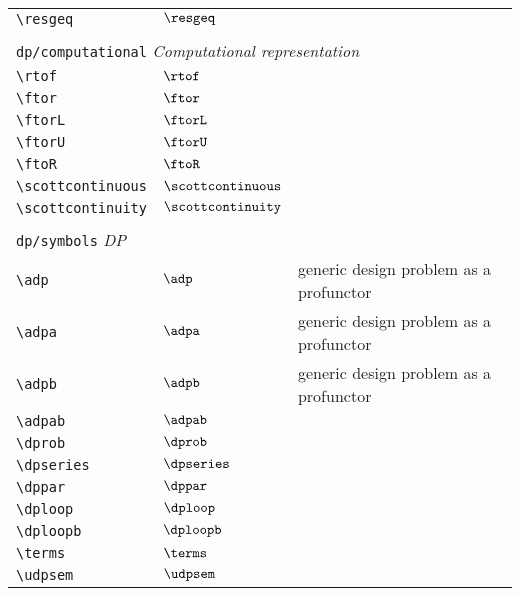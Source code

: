 \begin{longtable}{lll}
 {\color[rgb]{0.5,0.5,0.5}\texttt{\textbackslash resgeq}} & $\resgeq$ & \\ 
  &  & \\ 
 \multicolumn{3}{l}{{\color[rgb]{0.5,0.5,0.5}\texttt{dp/computational}} \emph{Computational representation}}\\ 
 \hline
{\color[rgb]{0.5,0.5,0.5}\texttt{\textbackslash rtof}} & $\rtof$ & \\ 
 {\color[rgb]{0.5,0.5,0.5}\texttt{\textbackslash ftor}} & $\ftor$ & \\ 
 {\color[rgb]{0.5,0.5,0.5}\texttt{\textbackslash ftorL}} & $\ftorL$ & \\ 
 {\color[rgb]{0.5,0.5,0.5}\texttt{\textbackslash ftorU}} & $\ftorU$ & \\ 
 {\color[rgb]{0.5,0.5,0.5}\texttt{\textbackslash ftoR}} & $\ftoR$ & \\ 
 {\color[rgb]{0.5,0.5,0.5}\texttt{\textbackslash scottcontinuous}} & $\scottcontinuous$ & \\ 
 {\color[rgb]{0.5,0.5,0.5}\texttt{\textbackslash scottcontinuity}} & $\scottcontinuity$ & \\ 
  &  & \\ 
 \multicolumn{3}{l}{{\color[rgb]{0.5,0.5,0.5}\texttt{dp/symbols}} \emph{DP}}\\ 
 \hline
{\color[rgb]{0.5,0.5,0.5}\texttt{\textbackslash adp}} & $\adp$ &  generic design problem as a profunctor\\ 
 {\color[rgb]{0.5,0.5,0.5}\texttt{\textbackslash adpa}} & $\adpa$ &  generic design problem as a profunctor\\ 
 {\color[rgb]{0.5,0.5,0.5}\texttt{\textbackslash adpb}} & $\adpb$ &  generic design problem as a profunctor\\ 
 {\color[rgb]{0.5,0.5,0.5}\texttt{\textbackslash adpab}} & $\adpab$ & \\ 
 {\color[rgb]{0.5,0.5,0.5}\texttt{\textbackslash dprob}} & $\dprob$ & \\ 
 {\color[rgb]{0.5,0.5,0.5}\texttt{\textbackslash dpseries}} & $\dpseries$ & \\ 
 {\color[rgb]{0.5,0.5,0.5}\texttt{\textbackslash dppar}} & $\dppar$ & \\ 
 {\color[rgb]{0.5,0.5,0.5}\texttt{\textbackslash dploop}} & $\dploop$ & \\ 
 {\color[rgb]{0.5,0.5,0.5}\texttt{\textbackslash dploopb}} & $\dploopb$ & \\ 
 {\color[rgb]{0.5,0.5,0.5}\texttt{\textbackslash terms}} & $\terms$ & \\ 
 {\color[rgb]{0.5,0.5,0.5}\texttt{\textbackslash udpsem}} & $\udpsem$ & \\ 

\end{longtable}
